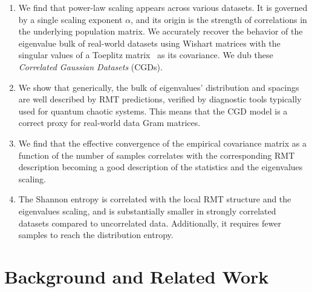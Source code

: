 \documentclass{article}
\begin{document}
\begin{enumerate}
    \item 
    We find that power-law scaling appears across various datasets. It is governed by a single scaling exponent $\alpha$, and its origin is the strength of correlations in the underlying population matrix.
    We accurately recover the behavior of the eigenvalue bulk of real-world datasets using Wishart matrices with the singular values of a Toeplitz matrix~\citep{CIT-006} as its covariance. We dub these {\it Correlated Gaussian Datasets} (CGDs).
    \item 
    We show that generically, the bulk of eigenvalues'
    distribution and spacings are well described by RMT predictions, verified by diagnostic tools typically used for quantum chaotic systems. This means that the CGD model is a correct proxy for real-world data Gram matrices. 
    \item 
    We find that the effective convergence of the empirical covariance matrix as a function of the number of samples correlates with the corresponding RMT description becoming a good description of the statistics and the eigenvalues scaling.
    \item 
    The Shannon entropy is correlated with the local RMT structure and the eigenvalues scaling, and is substantially smaller in strongly correlated datasets compared to uncorrelated data. Additionally, it requires fewer samples to reach the distribution entropy.
\end{enumerate}

\section{Background and Related Work}
\label{back}
\end{document}
